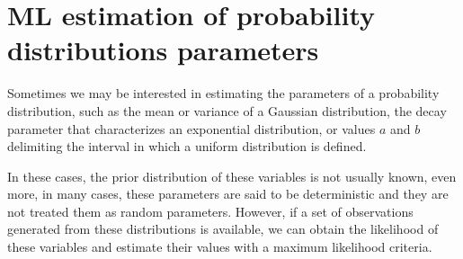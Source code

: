 \section{ML estimation of probability distributions parameters}

Sometimes we may be interested in estimating the parameters of a probability distribution, such as the mean or variance of a Gaussian distribution, the decay parameter that characterizes an exponential distribution, or values $a$ and $b$ delimiting the interval in which a uniform distribution is defined.

In these cases, the prior distribution of these variables is not usually known, even more, in many cases, these parameters are said to be deterministic and they are not treated them as random parameters. However, if a set of observations generated from these distributions is available, we can obtain the likelihood of these variables and estimate their values with a maximum likelihood criteria.



